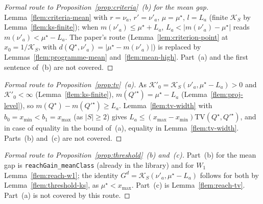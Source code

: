 \documentclass[11pt]{article}
\newcommand{\xmax}{x_{\max}}
\newcommand{\mean}{m}
\newcommand{\TV}{\mathrm{TV}}
\newcommand{\Ks}{\mathcal{K}_{S}}
\newcommand{\Wone}{W_{1}}
\newcommand{\Gd}{G}
\begin{document}
\begin{proof}[Formal route to Proposition~\ref{prop:criteria}~(b) for the mean gap]
Lemma~\ref{flem:criteria-mean} with $r=\nu_a$, $r'=\nu'_a$, $\mu=\mu^\star$, $l=L_a$ (finite $\Ks$ by
Lemma~\ref{flem:ks-finite}); when $\mean(\nu'_a)\le\mu^\star+L_a$, $L_a<|\mean(\nu'_a)-\mu^\star|$ reads
$\mean(\nu'_a)<\mu^\star-L_a$. The paper's route (Lemma~\ref{lem:criterion-point} at $x_0=1/\Ks$, with
$d(Q^\star,\nu'_a)=|\mu^\star-\mean(\nu'_a)|$) is replaced by Lemmas~\ref{flem:programme-mean}
and~\ref{flem:mean-high}. Part~(a) and the first sentence of~(b) are not covered.
\end{proof}

\begin{proof}[Formal route to Proposition~\ref{prop:tv}~(a)]
As $\mathcal K'_0=\Ks(\nu'_a,\mu^\star-L_a)>0$ and $\mathcal K'_0<\infty$
(Lemma~\ref{flem:ks-finite}), $\mean(Q'^\star)=\mu^\star-L_a$
(Lemma~\ref{flem:proj-level}), so $\mean(Q^\star)-\mean(Q'^\star)\ge L_a$. Lemma~\ref{flem:tv-width} with
$b_0=x_{\min}<b_1=\xmax$ (as $|S|\ge2$) gives $L_a\le(\xmax-x_{\min})\TV(Q^\star,Q'^\star)$, and in case
of equality in the bound of~(a), equality in Lemma~\ref{flem:tv-width}. Parts~(b) and~(c) are not
covered.
\end{proof}

\begin{proof}[Formal route to Proposition~\ref{prop:threshold}~(b) and~(c)]
Part~(b) for the mean gap is \texttt{reachGain\_meanClass} (already in the library) and for $\Wone$
Lemma~\ref{flem:reach-w1}; the identity $\Gd^d=\Ks(\nu'_a,\mu^\star-L_a)$ follows for both by
Lemma~\ref{flem:threshold-ks}, as $\mu^\star<\xmax$. Part~(c) is Lemma~\ref{flem:reach-tv}. Part~(a)
is not covered by this route.
\end{proof}
\end{document}
